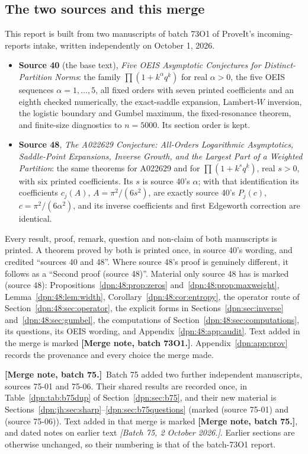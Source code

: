 \documentclass[11pt]{article}
\numberwithin{equation}{section}
\theoremstyle{definition}\newtheorem{definition}[theorem]{Definition}
\theoremstyle{remark}\newtheorem{remark}[theorem]{Remark}
\newcommand{\src}[1]{\textup{(source #1)}}
\newcommand{\mergenoteb}[1]{\par\smallskip\noindent\textbf{[Merge note, batch 75.]}\ #1\par\smallskip}
\begin{document}
\subsection{The two sources and this merge}\label{dpn:sec:merge}
This report is built from two manuscripts of batch 73O1 of ProveIt's
incoming-reports intake, written independently on October 1, 2026.
\begin{itemize}
\item \textbf{Source 40} (the base text), \emph{Five OEIS Asymptotic
  Conjectures for Distinct-Partition Norms}: the family
  $\prod(1+k^\alpha q^k)$ for real $\alpha>0$, the five OEIS sequences
  $\alpha=1,\dots,5$, all fixed orders with seven printed coefficients and an
  eighth checked numerically, the exact-saddle expansion, Lambert-$W$
  inversion, the logistic boundary and Gumbel maximum, the fixed-resonance
  theorem, and finite-size diagnostics to $n=5000$.  Its section order is
  kept.
\item \textbf{Source 48}, \emph{The A022629 Conjecture: All-Orders
  Logarithmic Asymptotics, Saddle-Point Expansions, Inverse Growth, and the
  Largest Part of a Weighted Partition}: the same theorems for A022629 and
  for $\prod(1+k^sq^k)$, real $s>0$, with six printed coefficients.  Its $s$
  is source 40's $\alpha$; with that identification its coefficients
  $c_j(A)$, $A=\pi^2/(6s^2)$, are exactly source 40's $P_j(c)$,
  $c=\pi^2/(6\alpha^2)$, and its inverse coefficients and first Edgeworth
  correction are identical.
\end{itemize}
Every result, proof, remark, question and non-claim of both manuscripts is
printed.  A theorem proved by both is printed once, in source 40's wording,
and credited ``sources 40 and 48''.  Where source 48's proof is genuinely
different, it follows as a ``Second proof (source 48)''.  Material only source
48 has is marked \src{48}: Propositions~\ref{dpn:48:prop:zeros}
and~\ref{dpn:48:prop:maxweight}, Lemma~\ref{dpn:48:lem:width},
Corollary~\ref{dpn:48:cor:entropy}, the operator route of
Section~\ref{dpn:48:sec:operator}, the explicit forms in
Sections~\ref{dpn:sec:inverse} and~\ref{dpn:48:sec:gumbel}, the computations
of Section~\ref{dpn:48:sec:computations}, its questions, its OEIS wording, and
Appendix~\ref{dpn:48:app:audit}.  Text added in the merge is marked
\textbf{[Merge note, batch 73O1.]}.  Appendix~\ref{dpn:app:prov} records the
provenance and every choice the merge made.
\mergenoteb{Batch 75 added two further independent manuscripts, sources
75-01 and 75-06.  Their shared results are recorded once, in
Table~\ref{dpn:tab:b75dup} of Section~\ref{dpn:sec:b75}, and their new
material is Sections~\ref{dpn:jh:sec:sharp}--\ref{dpn:sec:b75questions}
(marked \src{75-01} and \src{75-06}).  Text added in that merge is marked
\textbf{[Merge note, batch 75.]}, and dated notes on earlier text
\textit{[Batch 75, 2 October 2026.]}.  Earlier sections are otherwise
unchanged, so their numbering is that of the batch-73O1 report.}
\end{document}
